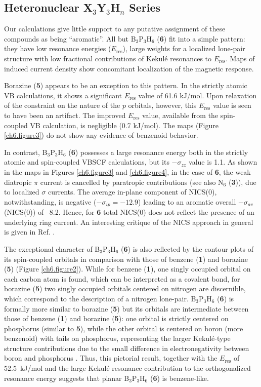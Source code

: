 \subsection{Heteronuclear X$_3$Y$_3$H$_n$ Series}

Our calculations give little support to any putative assignment of these
compounds as being ``aromatic''. All but B$_3$P$_3$H$_6$ (\textbf{6}) fit into a
simple pattern: they have low resonance energies ($E_{\mathrm{res}}$), large
weights for a localized lone-pair structure with low fractional contributions
of Kekul\'e resonances to $E_\mathrm{res}$. Maps of induced current density
show concomitant localization of the magnetic response.

Borazine (\textbf{5}) appears to be an exception to this pattern. In the strictly
atomic VB calculations, it shows a significant $E_\mathrm{res}$ value of 61.6 kJ/mol. Upon relaxation of
the constraint on the nature of the $p$ orbitals,
however, this $E_\mathrm{res}$ value is seen to have been an artifact. The improved $E_\mathrm{res}$ value, available from
the spin-coupled VB calculation, is negligible (0.7 kJ/mol). The maps
(Figure \ref{ch6.figure3}) do not show any evidence of benzenoid behavior.

In contrast, B$_3$P$_3$H$_6$ (\textbf{6}) possesses a large resonance
energy both in the strictly atomic and spin-coupled VBSCF calculations,
but its $-\sigma_{zz}$ value is 1.1. As shown in the maps in Figures \ref{ch6.figure3}
and \ref{ch6.figure4}, in the case of \textbf{6}, the weak diatropic $\pi$ current
is cancelled by paratropic contributions (see also N$_6$ (\textbf{3})), due to localized
$\sigma$ currents.  The average in-plane component of NICS(0), notwithstanding, is negative
($-\sigma_{ip}=-12.9$) leading to an aromatic overall $-\sigma_{av}$ (NICS(0)) of --8.2.  Hence,
for \textbf{6} total NICS(0) does not reflect the presence of an underlying ring current. An interesting critique of the NICS
approach in general is given in Ref.  \cite{paolo}.

The exceptional character of B$_3$P$_3$H$_6$ (\textbf{6}) is also reflected by the contour plots
of its spin-coupled orbitals in comparison with those of benzene (\textbf{1}) and borazine
(\textbf{5}) (Figure \ref{ch6.figure2}).  While for benzene (\textbf{1}), one singly occupied orbital on
each carbon atom is found, which can be interpreted as a covalent bond, for borazine
(\textbf{5}) two singly occupied orbitals centered on nitrogen are discernible, which
correspond to the description of a  nitrogen lone-pair.  B$_3$P$_3$H$_6$ (\textbf{6}) 
is formally more similar to borazine (\textbf{5}) but its orbitals are intermediate between
those of benzene (\textbf{1}) and borazine (\textbf{5}): one orbital is strictly centered
on phosphorus (similar to \textbf{5}), while the other orbital is centered on boron
(more benzenoid) with tails on phosphorus, representing the larger Kekul\'e-type
structure contributions due to the small difference in electronegativity between boron and
phosphorus  \cite{elecpauling}.  Thus, this pictorial result, together with the $E_\mathrm{res}$ of 52.5~kJ/mol
and the large Kekul\'e resonance contribution to the orthogonalized resonance energy suggests
that planar B$_3$P$_3$H$_6$  (\textbf{6}) is benzene-like. 

